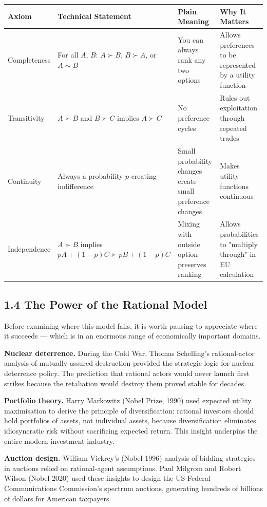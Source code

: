 \documentclass[12pt, letterpaper]{article}
\begin{document}
\begin{table}[H]
\centering
\small
\begin{tabularx}{\linewidth}{lYYY}
\toprule
Axiom & Technical Statement & Plain Meaning & Why It Matters \\
\midrule
Completeness & For all $A$, $B$: $A \succ B$, $B \succ A$, or $A \sim B$ & You can always rank any two options & Allows preferences to be represented by a utility function \\
Transitivity & $A \succ B$ and $B \succ C$ implies $A \succ C$ & No preference cycles & Rules out exploitation through repeated trades \\
Continuity & Always a probability $p$ creating indifference & Small probability changes create small preference changes & Makes utility functions continuous \\
Independence & $A \succ B$ implies $pA+(1-p)C \succ pB+(1-p)C$ & Mixing with outside option preserves ranking & Allows probabilities to "multiply through" in EU calculation \\
\bottomrule
\end{tabularx}
\end{table}


\medskip


\subsection{1.4 The Power of the Rational Model}


Before examining where this model fails, it is worth pausing to appreciate where it succeeds --- which is in an enormous range of economically important domains.

\textbf{Nuclear deterrence.} During the Cold War, Thomas Schelling's rational-actor analysis of mutually assured destruction provided the strategic logic for nuclear deterrence policy. The prediction that rational actors would never launch first strikes because the retaliation would destroy them proved stable for decades.

\textbf{Portfolio theory.} Harry Markowitz (Nobel Prize, 1990) used expected utility maximisation to derive the principle of diversification: rational investors should hold portfolios of assets, not individual assets, because diversification eliminates idiosyncratic risk without sacrificing expected return. This insight underpins the entire modern investment industry.

\textbf{Auction design.} William Vickrey's (Nobel 1996) analysis of bidding strategies in auctions relied on rational-agent assumptions. Paul Milgrom and Robert Wilson (Nobel 2020) used these insights to design the US Federal Communications Commission's spectrum auctions, generating hundreds of billions of dollars for American taxpayers.
\end{document}
